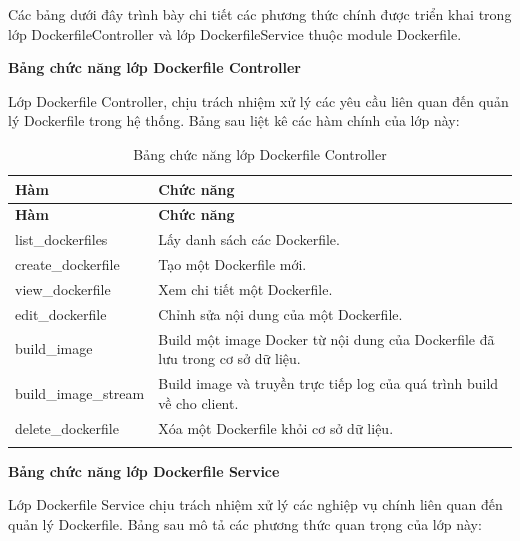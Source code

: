 \documentclass[../DoAn.tex]{subfiles}
\begin{document}
Các bảng dưới đây trình bày chi tiết các phương thức chính được triển khai trong lớp DockerfileController và lớp DockerfileService thuộc module Dockerfile.

\textbf{Bảng chức năng lớp Dockerfile Controller}

Lớp Dockerfile Controller, chịu trách nhiệm xử lý các yêu cầu liên quan đến quản lý Dockerfile trong hệ thống. Bảng sau liệt kê các hàm chính của lớp này:

\begin{longtable}{|p{5cm}|p{9cm}|}
\hline
\textbf{Hàm} & \textbf{Chức năng} \\ \hline
\endfirsthead

\hline
\textbf{Hàm} & \textbf{Chức năng} \\ \hline
\endhead

list\_dockerfiles & Lấy danh sách các Dockerfile. \\ \hline
create\_dockerfile & Tạo một Dockerfile mới. \\ \hline
view\_dockerfile & Xem chi tiết một Dockerfile. \\ \hline
edit\_dockerfile & Chỉnh sửa nội dung của một Dockerfile. \\ \hline
build\_image & Build một image Docker từ nội dung của Dockerfile đã lưu trong cơ sở dữ liệu. \\ \hline
build\_image\_stream & Build image và truyền trực tiếp log của quá trình build về cho client. \\ \hline
delete\_dockerfile & Xóa một Dockerfile khỏi cơ sở dữ liệu. \\ \hline

\caption{Bảng chức năng lớp Dockerfile Controller} \label{table:dockerfile-controller} \\
\end{longtable}

\vspace{0.5cm}

\textbf{Bảng chức năng lớp Dockerfile Service}

Lớp Dockerfile Service chịu trách nhiệm xử lý các nghiệp vụ chính liên quan đến quản lý Dockerfile. Bảng sau mô tả các phương thức quan trọng của lớp này:
\end{document}

